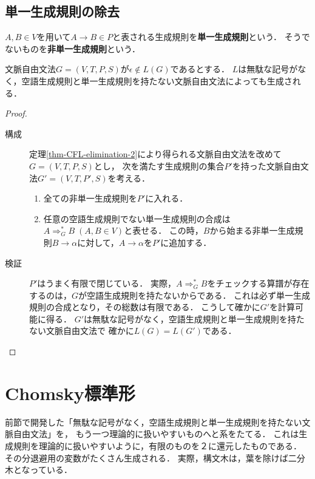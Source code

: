\documentclass[uplatex, dvipdfmx]{jsreport}
\begin{document}
\subsection{単一生成規則の除去}

\begin{definition}
    $A,B\in V$を用いて$A\to B\in P$と表される生成規則を\textbf{単一生成規則}という．
    そうでないものを\textbf{非単一生成規則}という．
\end{definition}

\begin{theorem}\label{thm-CFL-elimination-3}
    文脈自由文法$G=(V,T,P,S)$が$\epsilon\notin L(G)$であるとする．
    $L$は無駄な記号がなく，空語生成規則と単一生成規則を持たない文脈自由文法によっても生成される．
\end{theorem}
\begin{proof}\mbox{}
    \begin{description}
        \item[構成] 
    定理\ref{thm-CFL-elimination-2}により得られる文脈自由文法を改めて$G=(V,T,P,S)$とし，
    次を満たす生成規則の集合$P'$を持った文脈自由文法$G'=(V,T,P',S)$を考える．
    \begin{enumerate}
        \item 全ての非単一生成規則を$P'$に入れる．
        \item 任意の空語生成規則でない単一生成規則の合成は$A\Rightarrow^*_G B\;(A,B\in V)$と表せる．
        この時，$B$から始まる非単一生成規則$B\to\alpha$に対して，$A\to\alpha$を$P'$に追加する．
    \end{enumerate}
        \item[検証] $P'$はうまく有限で閉じている．
    実際，$A\Rightarrow^*_GB$をチェックする算譜が存在するのは，$G$が空語生成規則を持たないからである．
    これは必ず単一生成規則の合成となり，その総数は有限である．
    こうして確かに$G'$を計算可能に得る．
    $G'$は無駄な記号がなく，空語生成規則と単一生成規則を持たない文脈自由文法で
    確かに$L(G)=L(G')$である．
    \end{description}
\end{proof}

\section{Chomsky標準形}

\begin{tcolorbox}[colframe=ForestGreen, colback=ForestGreen!10!white, breakable,
    title=二分木化(binarization)]
    前節で開発した「無駄な記号がなく，空語生成規則と単一生成規則を持たない文脈自由文法」を，
    もう一つ理論的に扱いやすいものへと系をたてる．
    これは生成規則を理論的に扱いやすいように，有限のものを２に還元したものである．
    その分退避用の変数がたくさん生成される．
    実際，構文木は，葉を除けば二分木となっている．
\end{tcolorbox}
\end{document}
